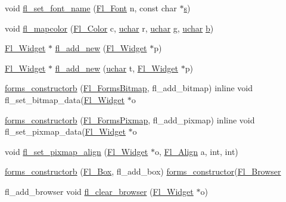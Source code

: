 \begin{DoxyCompactItemize}
void \hyperlink{forms_8_h_a941f48912a0c515e54d996a116cacbf5}{fl\+\_\+set\+\_\+font\+\_\+name} (\hyperlink{_enumerations_8_h_a2ac46d9f082834b969fffe490a03a709}{Fl\+\_\+\+Font} n, const char $\ast$\hyperlink{forms_8_h_a672b4f0a8c8a6db61068c721f799d87f}{s})
\item 
void \hyperlink{forms_8_h_a6945fcbddb4cb709089b8a7478451f61}{fl\+\_\+mapcolor} (\hyperlink{_enumerations_8_h_a8b762953646f8abee866061f1af78a6a}{Fl\+\_\+\+Color} c, \hyperlink{fl__types_8h_a65f85814a8290f9797005d3b28e7e5fc}{uchar} r, \hyperlink{fl__types_8h_a65f85814a8290f9797005d3b28e7e5fc}{uchar} g, \hyperlink{fl__types_8h_a65f85814a8290f9797005d3b28e7e5fc}{uchar} \hyperlink{forms_8_h_a0ba06a290a384fa06b1b90745827dae2}{b})
\item 
\hyperlink{class_fl___widget}{Fl\+\_\+\+Widget} $\ast$ \hyperlink{forms_8_h_a28097874af477fb5cb118aa64fed865a}{fl\+\_\+add\+\_\+new} (\hyperlink{class_fl___widget}{Fl\+\_\+\+Widget} $\ast$p)
\item 
\hyperlink{class_fl___widget}{Fl\+\_\+\+Widget} $\ast$ \hyperlink{forms_8_h_af7128319ad4075ba0b5624c950d4ed3d}{fl\+\_\+add\+\_\+new} (\hyperlink{fl__types_8h_a65f85814a8290f9797005d3b28e7e5fc}{uchar} t, \hyperlink{class_fl___widget}{Fl\+\_\+\+Widget} $\ast$p)
\item 
\hyperlink{forms_8_h_aef2c9bde7867d09bb46868ad5b80d775}{forms\+\_\+constructorb} (\hyperlink{class_fl___forms_bitmap}{Fl\+\_\+\+Forms\+Bitmap}, fl\+\_\+add\+\_\+bitmap) inline void fl\+\_\+set\+\_\+bitmap\+\_\+data(\hyperlink{class_fl___widget}{Fl\+\_\+\+Widget} $\ast$o
\item 
\hyperlink{forms_8_h_ad7e34ab40eaf16ae2fd683fe5fa51746}{forms\+\_\+constructorb} (\hyperlink{class_fl___forms_pixmap}{Fl\+\_\+\+Forms\+Pixmap}, fl\+\_\+add\+\_\+pixmap) inline void fl\+\_\+set\+\_\+pixmap\+\_\+data(\hyperlink{class_fl___widget}{Fl\+\_\+\+Widget} $\ast$o
\item 
void \hyperlink{forms_8_h_a71520cc58408ad27bccd323027b82618}{fl\+\_\+set\+\_\+pixmap\+\_\+align} (\hyperlink{class_fl___widget}{Fl\+\_\+\+Widget} $\ast$o, \hyperlink{_enumerations_8_h_a44e8bcd1e030e65e4f88cbae64a7c3e3}{Fl\+\_\+\+Align} a, int, int)
\item 
\hyperlink{forms_8_h_af620a3edc970290767b1756cd83e68a3}{forms\+\_\+constructorb} (\hyperlink{class_fl___box}{Fl\+\_\+\+Box}, fl\+\_\+add\+\_\+box) \hyperlink{forms_8_h_a78f97791090442a83b962429f17e8b07}{forms\+\_\+constructor}(\hyperlink{class_fl___browser}{Fl\+\_\+\+Browser}
\item 
fl\+\_\+add\+\_\+browser void \hyperlink{forms_8_h_a76ad0048dc68083ca2b1b133f756c236}{fl\+\_\+clear\+\_\+browser} (\hyperlink{class_fl___widget}{Fl\+\_\+\+Widget} $\ast$o)

\end{DoxyCompactItemize}

